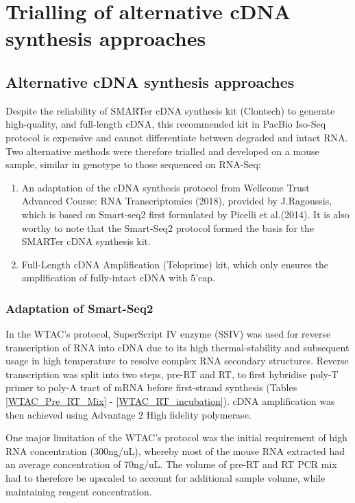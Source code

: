 \chapter{Trialling of alternative cDNA synthesis approaches}\label{ch:alt_cDNA}

\stoptocwriting
\section{Alternative cDNA synthesis approaches}
Despite the reliability of SMARTer cDNA synthesis kit (Clontech) to generate high-quality, and full-length cDNA, this recommended kit in PacBio Iso-Seq protocol is expensive and cannot differentiate between degraded and intact RNA. Two alternative methods were therefore trialled and developed on a mouse sample, similar in genotype to those sequenced on RNA-Seq:

\begin{enumerate}
	\item An adaptation of the cDNA synthesis protocol from Wellcome Trust Advanced Course: RNA Transcriptomics (2018), provided by J.Ragoussis, which is based on Smart-seq2 first formulated by Picelli et al.(2014). It is also worthy to note that the Smart-Seq2 protocol formed the basis for the SMARTer cDNA synthesis kit. 
	\item Full-Length cDNA Amplification (Teloprime) kit, which only ensures the amplification of fully-intact cDNA with 5'cap.    
\end{enumerate}

\subsection{Adaptation of Smart-Seq2}
In the WTAC's protocol, SuperScript IV enzyme (SSIV) was used for reverse transcription of RNA into cDNA due to its high thermal-stability and subsequent usage in high temperature to resolve complex RNA secondary structures. Reverse transcription was split into two steps, pre-RT and RT, to first hybridise poly-T primer to poly-A tract of mRNA before first-strand synthesis (Tables \ref{WTAC_Pre_RT_Mix} - \ref{WTAC_RT_incubation}). cDNA amplification was then achieved using Advantage 2 High fidelity polymerase.

One major limitation of the WTAC's protocol was the initial requirement of high RNA concentration (300ng/uL), whereby most of the mouse RNA extracted had an average concentration of 70ng/uL. The volume of pre-RT and RT PCR mix had to therefore be upscaled to account for additional sample volume, while maintaining reagent concentration. 




